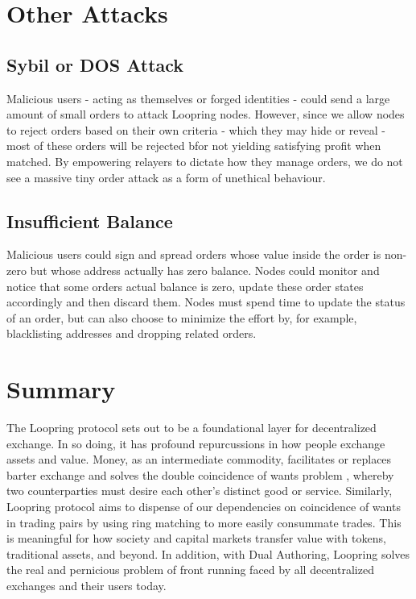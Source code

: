\documentclass[UTF8,nofonts]{article}
\begin{document}
\begin{multicols}{2}
\section{Other Attacks}

\subsection{Sybil or DOS Attack}
Malicious users - acting as themselves or forged identities - could send a large amount of small orders to attack Loopring nodes. However, since we allow nodes to reject orders based on their own criteria - which they may hide or reveal - most of these orders will be rejected bfor not yielding satisfying profit when matched.  By empowering relayers to dictate how they manage orders, we do not see a massive tiny order attack as a form of unethical behaviour.

\subsection{Insufficient Balance}
Malicious users could sign and spread orders whose value inside the order is non-zero but whose address actually has zero balance. Nodes could monitor and notice that some orders actual balance is zero, update these order states accordingly and then discard them.
Nodes must spend time to update the status of an order, but can also choose to minimize the effort by, for example, blacklisting addresses and dropping related orders.

\section{Summary}
The Loopring protocol sets out to be a foundational layer for decentralized exchange. In so doing, it has profound repurcussions in how people exchange assets and value. Money, as an intermediate commodity, facilitates or replaces barter exchange and solves the double coincidence of wants problem \cite{unenumerated2006}, whereby two counterparties must desire each other's distinct good or service. Similarly, Loopring protocol aims to dispense of our dependencies on coincidence of wants in trading pairs by using ring matching to more easily consummate trades. This is meaningful for how society and capital markets transfer value with tokens, traditional assets, and beyond. In addition, with Dual Authoring, Loopring solves the real and pernicious problem of front running faced by all decentralized exchanges and their users today.


\end{multicols}
\end{document}
